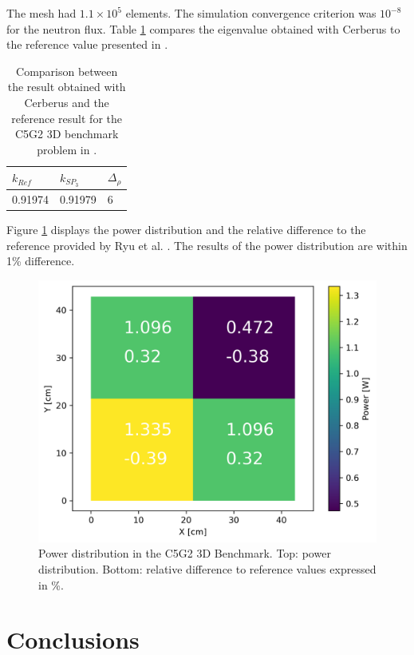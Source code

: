 \documentclass{anstrans}
\begin{document}
The mesh had $1.1 \times 10^{5}$ elements.
The simulation convergence criterion was $10^{-8}$ for the neutron flux.
Table \ref{tab:keff-4th} compares the eigenvalue obtained with Cerberus to the reference value presented in \cite{ryu_finite_2013}.

\begin{table}[htbp!]
    \centering
    \caption{Comparison between the result obtained with Cerberus and the reference result for the C5G2 3D benchmark problem in \cite{ryu_finite_2013}.}
    \label{tab:keff-4th}
    \begin{tabular}{lll}
    \toprule
        $k_{Ref}$   & $k_{SP_3}$    & $\Delta_{\rho}$   \\
    \midrule
        0.91974     & 0.91979       & 6                 \\
    \bottomrule
    \end{tabular}
\end{table}

Figure \ref{fig:c5g2-3d-power} displays the power distribution and the relative
difference to the reference provided by Ryu et al. \cite{ryu_finite_2013}.
The results of the power distribution are within 1\% difference.

\begin{figure}[h] %
    \centering
    \includegraphics[width=0.65\linewidth]{figures/C5G23D-distrib.png}
    \hfill
    \caption{Power distribution in the C5G2 3D Benchmark. Top: power distribution. Bottom: relative difference to reference values expressed in \%.}
    \label{fig:c5g2-3d-power}
\end{figure}


\section{Conclusions}
\end{document}
